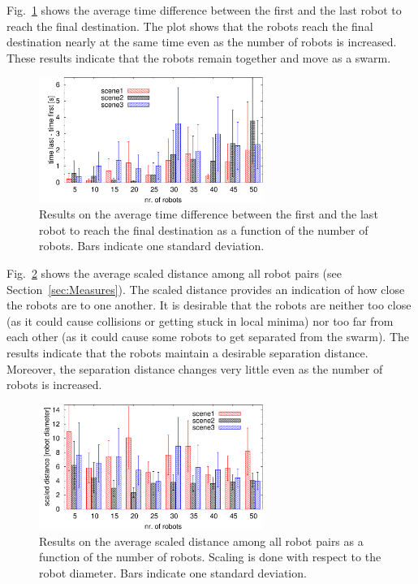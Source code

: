 \documentclass{llncs}
\begin{document}
Fig.~\ref{fig:ResFL} shows the average time difference between the
first and the last robot to reach the final destination. The plot
shows that the robots reach the final destination nearly at the same
time even as the number of robots is increased. These results indicate
that the robots remain together and move as a swarm.  



\begin{figure}
\centering
\includegraphics[width=0.65\textwidth]{figResFL}
\caption{Results on the average time difference between the first and
  the last robot to reach the
  final destination as a function of the number of robots. Bars
  indicate one standard deviation.}
\label{fig:ResFL}
\end{figure}

Fig.~\ref{fig:ResD} shows the average scaled distance among all robot
pairs (see Section~\ref{sec:Measures}). The scaled distance provides
an indication of how close the robots are to one another. It is
desirable that the robots are neither too close (as it could cause
collisions or getting stuck in local minima) nor too far from each
other (as it could cause some robots to get separated from the
swarm). The results indicate that the robots maintain a desirable
separation distance. Moreover, the separation distance changes very
little even as the number of robots is increased.

\begin{figure}
\centering
\includegraphics[width=0.65\textwidth]{figResD}
\caption{Results on the average scaled distance among all robot pairs
  as a function of the number of robots. Scaling is done with respect
  to the robot diameter. Bars
  indicate one standard deviation.}
\label{fig:ResD}
\end{figure}
\end{document}

